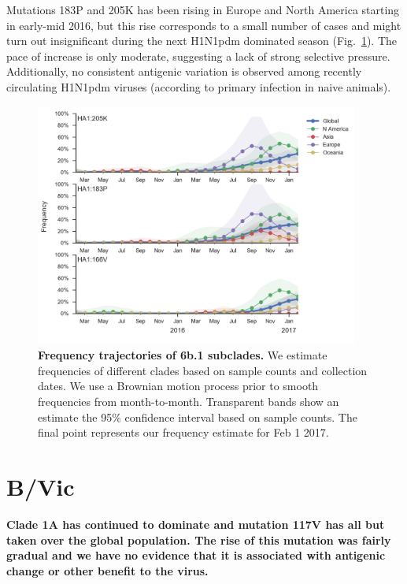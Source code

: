\documentclass[11pt,oneside,letterpaper]{article}
\begin{document}
\pagebreak

Mutations 183P and 205K has been rising in Europe and North America starting in early-mid 2016, but this rise corresponds to a small number of cases and might turn out insignificant during the next H1N1pdm dominated season (Fig.\ \ref{H1N1pdm_mutations}). The pace of increase is only moderate, suggesting a lack of strong selective pressure. Additionally, no consistent antigenic variation is observed among recently circulating H1N1pdm viruses (according to primary infection in naive animals).

\begin{figure}[H]
	\centering
	\includegraphics[width=0.95\textwidth]{../figures/feb-2017/H1N1pdm_mutations.png}
	\caption{\textbf{Frequency trajectories of 6b.1 subclades.}
	We estimate frequencies of different clades based on sample counts and collection dates.
	We use a Brownian motion process prior to smooth frequencies from month-to-month.
	Transparent bands show an estimate the 95\% confidence interval based on sample counts.
	The final point represents our frequency estimate for Feb 1 2017.
	}
	\label{H1N1pdm_mutations}
\end{figure}

\clearpage
\pagebreak

\section*{B/Vic}

\textbf{Clade 1A has continued to dominate and mutation 117V has all but taken over the global population.
The rise of this mutation was fairly gradual and we have no evidence that it is associated with antigenic change or other benefit to the virus.}
\end{document}
